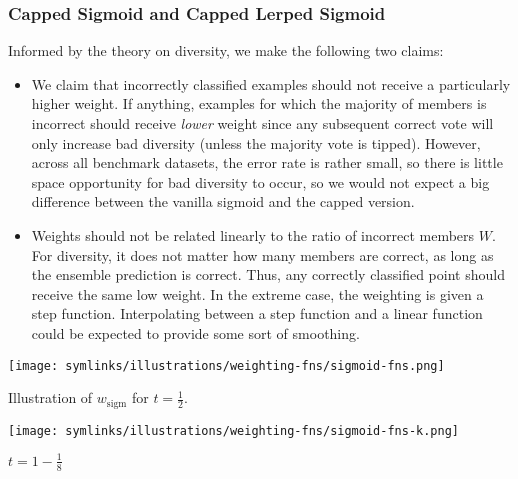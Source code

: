 \documentclass[../main.tex]{subfiles}
\begin{document}
\subsubsection{Capped Sigmoid and Capped Lerped Sigmoid}
Informed by the theory on diversity, we make the following two claims:
\begin{itemize}
    \item We claim that incorrectly classified examples should not receive a particularly higher weight. If anything, examples for which the majority of members is incorrect should receive \textit{lower} weight since any subsequent correct vote will only increase bad diversity (unless the majority vote is tipped). However, across all benchmark datasets, the error rate is rather small, so there is little space opportunity for bad diversity to occur, so we would not expect a big difference between the vanilla sigmoid and the capped version. %
    \item Weights should not be related linearly to the ratio of incorrect members $W$. For diversity, it does not matter how many members are correct, as long as the ensemble prediction is correct. Thus, any correctly classified point should receive the same low weight. In the extreme case, the weighting is given a step function. Interpolating between a step function and a linear function could be expected to provide some sort of smoothing.
\end{itemize}

\begin{marginfigure}
    \texttt{[image: symlinks/illustrations/weighting-fns/sigmoid-fns.png]}
    \caption{Illustration of $w_{\text{sigm}}$ for $t = \frac{1}{2}$.}
\end{marginfigure}

\begin{marginfigure}
    \texttt{[image: symlinks/illustrations/weighting-fns/sigmoid-fns-k.png]}
    \caption{$t = 1 - \frac{1}{8}$}
\end{marginfigure}

\end{document}
